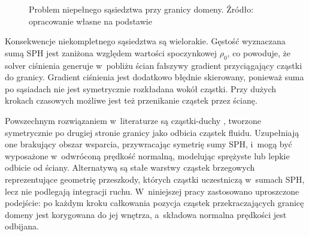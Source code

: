 \begin{figure}[ht]
\centering
{}
\caption{Problem niepełnego sąsiedztwa przy granicy domeny. Źródło: opracowanie własne na podstawie \cite{schechter2012ghost}}
\label{fig:boundary_support}
\end{figure}

Konsekwencje niekompletnego sąsiedztwa są wielorakie. Gęstość wyznaczana sumą
SPH jest zaniżona względem wartości spoczynkowej $\rho_0$, co powoduje, że solver
ciśnienia generuje w~pobliżu ścian fałszywy gradient przyciągający cząstki do
granicy. Gradient ciśnienia jest dodatkowo błędnie skierowany, ponieważ suma
po sąsiadach nie jest symetrycznie rozkładana wokół cząstki. Przy dużych
krokach czasowych możliwe jest też przenikanie cząstek przez ścianę.

Powszechnym rozwiązaniem w~literaturze są cząstki-duchy \cite{schechter2012ghost},
tworzone symetrycznie po drugiej stronie granicy jako odbicia cząstek fluidu.
Uzupełniają one brakujący obszar wsparcia, przywracając symetrię sumy SPH, i~mogą
być wyposażone w~odwróconą prędkość normalną, modelując sprężyste lub lepkie odbicie
od ściany. Alternatywą są stałe warstwy cząstek brzegowych reprezentujące
geometrię przeszkody, których cząstki uczestniczą w~sumach SPH, lecz nie podlegają
integracji ruchu. W~niniejszej pracy zastosowano uproszczone podejście: po każdym
kroku całkowania pozycja cząstek przekraczających granicę domeny jest korygowana
do jej wnętrza, a~składowa normalna prędkości jest odbijana.

